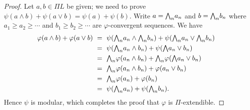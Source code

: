 \documentclass[main.tex]{subfiles}
\begin{document}
\begin{proof}
Let $a,b\in \Pi L$ be given; 
we need to prove $\psi(a\wedge b) + \psi(a\vee b)= \psi(a)+\psi(b)$.
Write  $a = \textstyle{\bigwedge}_n a_n$ and $b = \textstyle{\bigwedge}_n b_n$
where 
 $a_1 \geq a_2 \geq \dotsb$ and $b_1 \geq b_2 \geq \dotsb$
are $\varphi$-convergent sequences.
We have
\begin{alignat*}{3}
\varphi(a\wedge b) + \varphi(a \vee b) 
\ &=\ \psi(\textstyle{\bigwedge}_n a_n \wedge \textstyle{\bigwedge}_n b_n) + \psi(\textstyle{\bigwedge}_n a_n \vee \textstyle{\bigwedge}_n b_n) \\
\ &=\ \psi(\textstyle{\bigwedge}_n a_n \wedge b_n) + \psi(\textstyle{\bigwedge} a_n \vee b_n) \\
  &=\ \textstyle{\bigwedge}_n \varphi(a_n \wedge b_n) + \textstyle{\bigwedge}_n \varphi(\textstyle{\bigwedge} a_n \vee b_n) \\
  &=\ \textstyle{\bigwedge}_n \varphi(a_n \wedge b_n) + \varphi(a_n \vee b_n) \\
  &=\ \textstyle{\bigwedge}_n \varphi(a_n) + \varphi(b_n) \\
  &=\ \psi(\textstyle{\bigwedge}_n a_n) + \psi(\textstyle{\bigwedge}_n b_n).
\end{alignat*}
Hence $\psi$ is modular, which completes the proof
that $\varphi$ is $\Pi$-extendible.
\end{proof}
\end{document}
